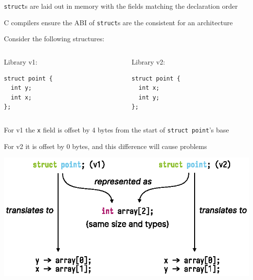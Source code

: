   \begin{slide}


    \texttt{struct}s are laid out in memory with the fields matching the
    declaration order

    \leftspace{}C compilers ensure the ABI of \texttt{struct}s are the
    consistent for an architecture
    \medskip

    Consider the following structures:
    \medskip
    \begin{columns}
      \begin{column}{0.4\textwidth}
        Library v1:
        \begin{verbatim}
struct point {
  int y;
  int x;
};
        \end{verbatim}
      \end{column}
      \begin{column}{0.4\textwidth}
        Library v2:
        \begin{verbatim}
struct point {
  int x;
  int y;
};
        \end{verbatim}
      \end{column}
    \end{columns}
    \medskip

    For v1 the \texttt{x} field is offset by 4 bytes from the start of
    \texttt{struct point}'s base

    \leftspace{}For v2 it is offset by 0 bytes, and this difference
    will cause problems
  \end{slide}

  \begin{slide}
    
  
    \includegraphics{point-representation.eps}

  \end{slide}

